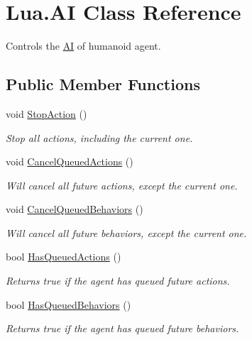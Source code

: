 \hypertarget{class_lua_1_1_a_i}{}\section{Lua.\+AI Class Reference}
\label{class_lua_1_1_a_i}


Controls the \mbox{\hyperlink{class_lua_1_1_a_i}{AI}} of humanoid agent.  


\subsection*{Public Member Functions}
\begin{DoxyCompactItemize}
\item 
void \mbox{\hyperlink{class_lua_1_1_a_i_ab29a427f16c210c0839771b2552b21ce}{Stop\+Action}} ()
\begin{DoxyCompactList}\small\item\em Stop all actions, including the current one. \end{DoxyCompactList}\item 
void \mbox{\hyperlink{class_lua_1_1_a_i_acae3b8822867d658c5dc7c409af76e11}{Cancel\+Queued\+Actions}} ()
\begin{DoxyCompactList}\small\item\em Will cancel all future actions, except the current one. \end{DoxyCompactList}\item 
void \mbox{\hyperlink{class_lua_1_1_a_i_a1c8effd2d78be1f69eb84e3db9b02b0f}{Cancel\+Queued\+Behaviors}} ()
\begin{DoxyCompactList}\small\item\em Will cancel all future behaviors, except the current one. \end{DoxyCompactList}\item 
bool \mbox{\hyperlink{class_lua_1_1_a_i_a7d2bab4d5dfc0389ab5eeabed6befad7}{Has\+Queued\+Actions}} ()
\begin{DoxyCompactList}\small\item\em Returns true if the agent has queued future actions. \end{DoxyCompactList}\item 
bool \mbox{\hyperlink{class_lua_1_1_a_i_a51825e643d119b005db422ef6f51d353}{Has\+Queued\+Behaviors}} ()
\begin{DoxyCompactList}\small\item\em Returns true if the agent has queued future behaviors. \end{DoxyCompactList}\item 

\end{DoxyCompactItemize}
